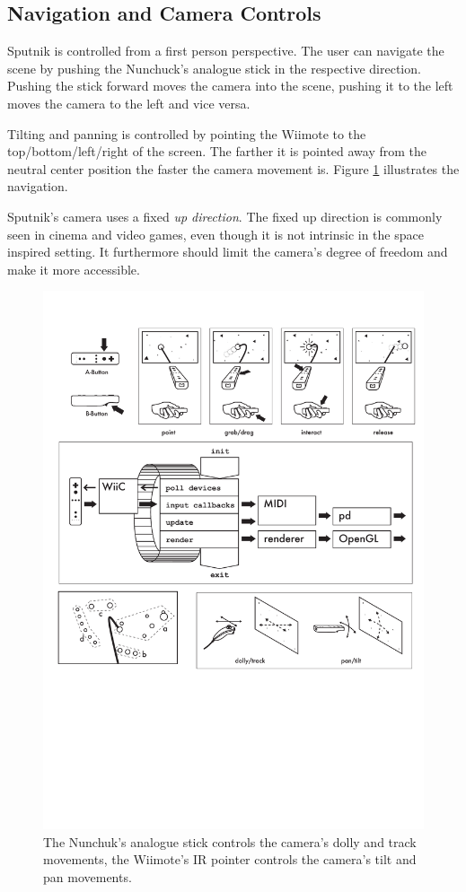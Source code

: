 \documentclass[10pt,a4paper]{scrartcl}
\begin{document}
\subsection{Navigation and Camera Controls}
Sputnik is controlled from a first person perspective. The user can navigate the scene by pushing the Nunchuck's analogue stick in the respective direction. Pushing the stick forward moves the camera into the scene, pushing it to the left moves the camera to the left and vice versa.

Tilting and panning is controlled by pointing the Wiimote to the top/bottom/left/right of the screen. The farther it is pointed away from the neutral center position the faster the camera movement is. Figure \ref{fig:sputnik-navigation} illustrates the navigation.

Sputnik's camera uses a fixed \emph{up direction}. The fixed up direction is commonly seen in cinema and video games, even though it is not intrinsic in the space inspired setting. It furthermore should limit the camera's degree of freedom and make it more accessible.

\begin{figure}[hbtp]
\begin{center}
\includegraphics[width=0.7\columnwidth]{img/navigation}
\caption{The Nunchuk's analogue stick controls the camera's dolly and track movements, the Wiimote's IR pointer controls the camera's tilt and pan movements.}
\label{fig:sputnik-navigation}
\end{center}
\end{figure}
\end{document}
